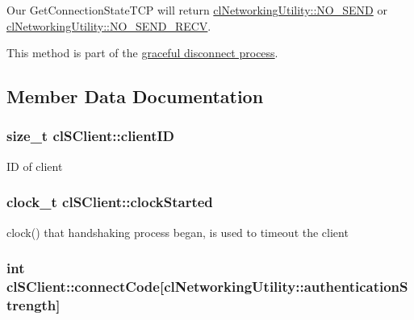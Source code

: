  Our GetConnectionStateTCP will return \hyperlink{classcl_networking_utility_a15dd34683154e07d5843f8f5432fec6dab8241425bb2dc77be7422346559bbb30}{clNetworkingUtility::NO\_\-SEND} or \hyperlink{classcl_networking_utility_a15dd34683154e07d5843f8f5432fec6da049f6833fe3ed9d08cfe5047078b73e3}{clNetworkingUtility::NO\_\-SEND\_\-RECV}. \par
 This method is part of the \hyperlink{graceful_disconnect_page}{graceful disconnect process}. 

\subsection{Member Data Documentation}
\hypertarget{classcl_s_client_ac5af0964e2af13aab950694923308512}{
\subsubsection[{clientID}]{\setlength{\rightskip}{0pt plus 5cm}size\_\-t {\bf clSClient::clientID}}}
\label{classcl_s_client_ac5af0964e2af13aab950694923308512}
ID of client \hypertarget{classcl_s_client_a94a58dbecbb367d53535efd533602100}{
\subsubsection[{clockStarted}]{\setlength{\rightskip}{0pt plus 5cm}clock\_\-t {\bf clSClient::clockStarted}}}
\label{classcl_s_client_a94a58dbecbb367d53535efd533602100}
{\ttfamily clock()} that handshaking process began, is used to timeout the client \hypertarget{classcl_s_client_a051064752aa82c8787204336927897c1}{
\subsubsection[{connectCode}]{\setlength{\rightskip}{0pt plus 5cm}int {\bf clSClient::connectCode}\mbox{[}{\bf clNetworkingUtility::authenticationStrength}\mbox{]}}}
\label{classcl_s_client_a051064752aa82c8787204336927897c1}

